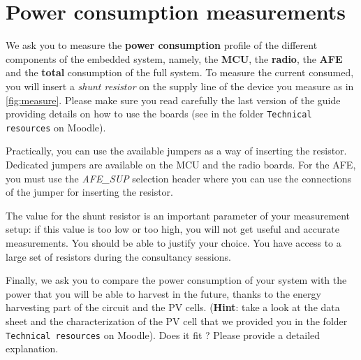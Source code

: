 \newpage
\section{Power consumption measurements}
We ask you to measure the \textbf{power consumption} profile of the different
components of the embedded system, namely, the \textbf{MCU}, the \textbf{radio},
the \textbf{AFE} and the \textbf{total} consumption of the full system.
To measure the current consumed, you will insert
a \emph{shunt resistor} on the supply line of the device you
measure as in \autoref{fig:measure}. Please make sure you read carefully the last version
of the guide providing details on how to use the boards (see in the folder \texttt{Technical resources} on Moodle).

Practically, you can use the available jumpers as a way of inserting the
resistor. Dedicated jumpers are available on the MCU and the radio boards.
For the AFE, you must use the \textit{AFE\_SUP} selection header where you can
use the connections of the jumper for inserting the resistor.

The value for the shunt resistor is an important parameter of your measurement
setup: if this value is too low or too high, you will not get useful and
accurate measurements. You should be able to justify your choice.
You have access to a large set of resistors during the consultancy sessions.

Finally, we ask you to compare the power consumption of your system with the power that you will be able to harvest
in the future, thanks to the energy harvesting part of the circuit and the PV cells. (\textbf{Hint}: take a look at the data sheet and the characterization of the PV cell that we provided you in the folder \texttt{Technical resources} on Moodle). Does it fit ? Please provide a detailed explanation.


